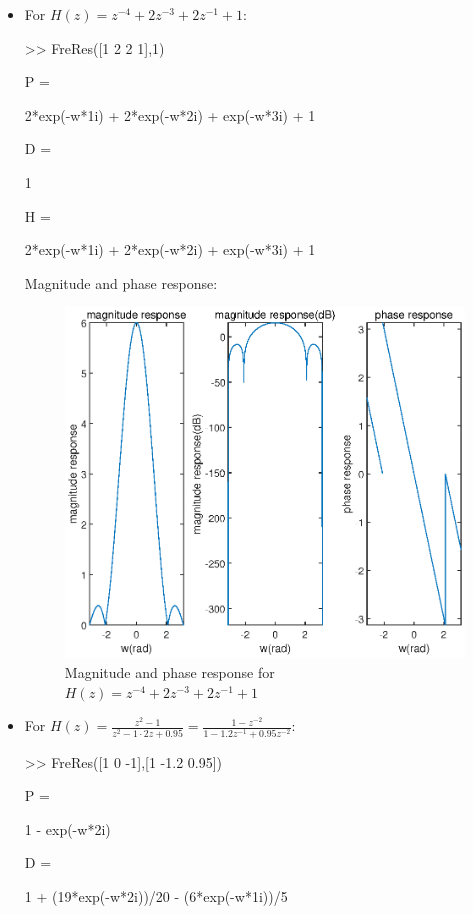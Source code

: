 \documentclass[onecolumn,oneside]{SUSTechHomework}
\begin{document}
\begin{itemize}
    \item For $H(z)=z^{-4}+2 z^{-3}+2 z^{-1}+1$:
\begin{commandline}
    >> FreRes([1 2 2 1],1)
 
    P =
     
    2*exp(-w*1i) + 2*exp(-w*2i) + exp(-w*3i) + 1
     
     
    D =
     
    1
     
     
    H =
     
    2*exp(-w*1i) + 2*exp(-w*2i) + exp(-w*3i) + 1
\end{commandline}
    Magnitude and phase response:
    \begin{figure}[H]
        \centering
        \includegraphics[width=140mm]{pictures/q6_2_3(a).eps}
        \caption{ Magnitude and phase response for $H(z)=z^{-4}+2 z^{-3}+2 z^{-1}+1$}
    \end{figure}
    \item For $H(z)=\frac{z^{2}-1}{z^{2}-1 \cdot 2 z+0.95}=\frac{1-z^{-2}}{1-1.2z^{-1}+0.95z^{-2}}$:
\begin{commandline}
    >> FreRes([1 0 -1],[1 -1.2 0.95])
 
    P =
     
    1 - exp(-w*2i)
     
     
    D =
     
    1 + (19*exp(-w*2i))/20 - (6*exp(-w*1i))/5
     

\end{commandline}
\end{itemize}
\end{document}
